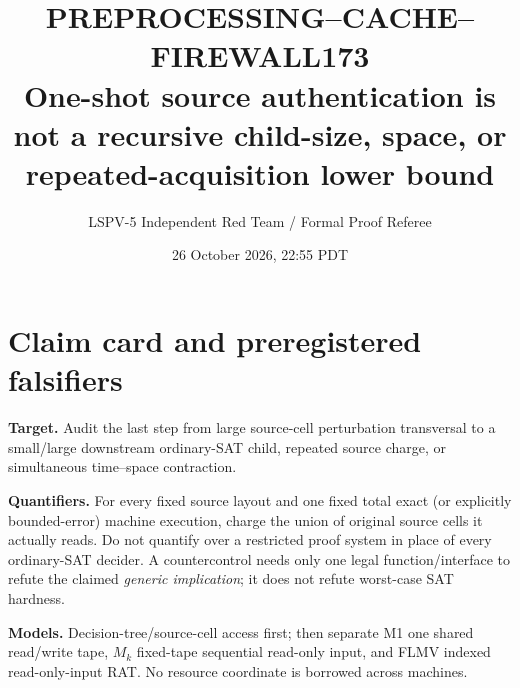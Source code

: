 \documentclass[11pt]{article}
\title{PREPROCESSING--CACHE--FIREWALL173\\\large One-shot source authentication is not a recursive child-size, space, or repeated-acquisition lower bound}
\author{LSPV-5 Independent Red Team / Formal Proof Referee}
\date{26 October 2026, 22:55 PDT}
\begin{document}
\maketitle

\begin{center}
\end{center}

\section{Claim card and preregistered falsifiers}
\textbf{Target.}  Audit the last step from large source-cell perturbation transversal to a small/large downstream ordinary-SAT child, repeated source charge, or simultaneous time--space contraction.

\textbf{Quantifiers.}  For every fixed source layout and one fixed total exact (or explicitly bounded-error) machine execution, charge the union of original source cells it actually reads.  Do not quantify over a restricted proof system in place of every ordinary-SAT decider.  A countercontrol needs only one legal function/interface to refute the claimed \emph{generic implication}; it does not refute worst-case SAT hardness.

\textbf{Models.}  Decision-tree/source-cell access first; then separate M1 one shared read/write tape, $M_k$ fixed-tape sequential read-only input, and FLMV indexed read-only-input RAT.  No resource coordinate is borrowed across machines.
\end{document}
